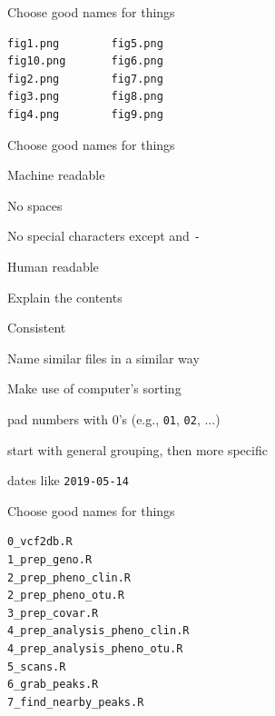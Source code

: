 \documentclass[aspectratio=169,12pt,t]{beamer}
\begin{document}
\begin{frame}[fragile,c]{Choose good names for things}

\begin{center}
\begin{minipage}[c]{8.3cm}
\begin{semiverbatim}
\lstset{basicstyle=\normalsize}
\begin{lstlisting}[linewidth=8.3cm]
fig1.png        fig5.png
fig10.png       fig6.png
fig2.png        fig7.png
fig3.png        fig8.png
fig4.png        fig9.png
\end{lstlisting}
\end{semiverbatim}
\end{minipage}
\end{center}

\end{frame}






\begin{frame}[c]{Choose good names for things}

  \bbi
  \item Machine readable
    \bi
    \item No spaces
    \item No special characters except {\textunderscore} and
      {\tt -}
    \ei

  \item Human readable
    \bi
    \item Explain the contents
    \ei

  \item Consistent
    \bi
      \item Name similar files in a similar way
    \ei

  \item Make use of computer's sorting
    \bi
      \item pad numbers with 0's (e.g., {\tt 01}, {\tt 02}, ...)
      \item start with general grouping, then more specific
      \item dates like {\tt 2019-05-14}
    \ei

  \ei
\end{frame}



\begin{frame}[fragile,c]{Choose good names for things}

\begin{center}
\begin{minipage}[c]{10.3cm}
\begin{semiverbatim}
\lstset{basicstyle=\normalsize}
\begin{lstlisting}[linewidth=10.3cm]
0_vcf2db.R
1_prep_geno.R
2_prep_pheno_clin.R
2_prep_pheno_otu.R
3_prep_covar.R
4_prep_analysis_pheno_clin.R
4_prep_analysis_pheno_otu.R
5_scans.R
6_grab_peaks.R
7_find_nearby_peaks.R
\end{lstlisting}
\end{semiverbatim}
\end{minipage}
\end{center}

\end{frame}
\end{document}
